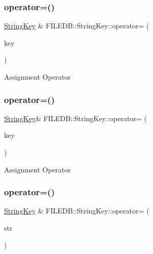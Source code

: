 \mbox{\label{classFILEDB_1_1StringKey_a2081a1d6473a3139ecdd642dcc2874ba}} 
\subsubsection{\texorpdfstring{operator=()}{operator=()}\hspace{0.1cm}{\footnotesize\ttfamily [1/4]}}
{\footnotesize\ttfamily \mbox{\hyperlink{classFILEDB_1_1StringKey}{String\+Key}} \& F\+I\+L\+E\+D\+B\+::\+String\+Key\+::operator= (\begin{DoxyParamCaption}\item[{const \mbox{\hyperlink{classFILEDB_1_1StringKey}{String\+Key}} \&}]{key }\end{DoxyParamCaption})}

Assignment Operator \mbox{\label{classFILEDB_1_1StringKey_ab4a0ca971c84abd8b85f6d423163a00f}} 
\subsubsection{\texorpdfstring{operator=()}{operator=()}\hspace{0.1cm}{\footnotesize\ttfamily [2/4]}}
{\footnotesize\ttfamily \mbox{\hyperlink{classFILEDB_1_1StringKey}{String\+Key}}\& F\+I\+L\+E\+D\+B\+::\+String\+Key\+::operator= (\begin{DoxyParamCaption}\item[{const \mbox{\hyperlink{classFILEDB_1_1StringKey}{String\+Key}} \&}]{key }\end{DoxyParamCaption})}

Assignment Operator \mbox{\label{classFILEDB_1_1StringKey_a0d36351143904ce0b1b6716e4f95d8b5}} 
\subsubsection{\texorpdfstring{operator=()}{operator=()}\hspace{0.1cm}{\footnotesize\ttfamily [3/4]}}
{\footnotesize\ttfamily \mbox{\hyperlink{classFILEDB_1_1StringKey}{String\+Key}} \& F\+I\+L\+E\+D\+B\+::\+String\+Key\+::operator= (\begin{DoxyParamCaption}\item[{const std\+::string \&}]{str }\end{DoxyParamCaption})}

